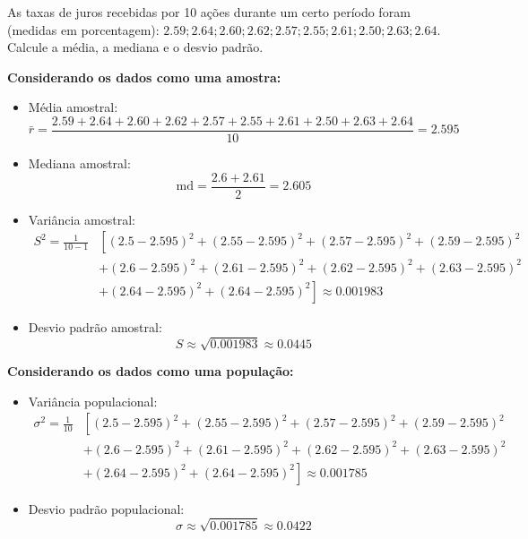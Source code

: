 \documentclass{article}
\begin{document}
As taxas de juros recebidas por 10 ações durante um certo período foram (medidas em porcentagem):
$2.59; 2.64; 2.60; 2.62; 2.57; 2.55; 2.61; 2.50; 2.63; 2.64$. Calcule a média, a mediana e o desvio padrão.

\textbf{Considerando os dados como uma amostra:}

\begin{itemize}
    \item Média amostral:
    \[
    \bar{r} = \frac{2.59 + 2.64 + 2.60 + 2.62 + 2.57 + 2.55 + 2.61 + 2.50 + 2.63 + 2.64}{10} = 2.595
    \]
    
    \item Mediana amostral:
    \[
    \text{md} = \frac{2.6 + 2.61}{2} = 2.605
    \]
    
    \item Variância amostral:
    \[
    \begin{split}
    S^2 = \frac{1}{10 - 1} & \left[ (2.5 - 2.595)^2 + (2.55 - 2.595)^2 + (2.57 - 2.595)^2 + (2.59 - 2.595)^2 \right. \\
    & \left. + (2.6 - 2.595)^2 + (2.61 - 2.595)^2 + (2.62 - 2.595)^2 + (2.63 - 2.595)^2 \right. \\
    & \left. + (2.64 - 2.595)^2 + (2.64 - 2.595)^2 \right] \approx 0.001983
    \end{split}
    \]
    
    \item Desvio padrão amostral:
    \[
    S \approx \sqrt{0.001983} \approx 0.0445
    \]
\end{itemize}

\textbf{Considerando os dados como uma população:}

\begin{itemize}
    \item Variância populacional:
    \[
    \begin{split}
    \sigma^2 = \frac{1}{10} & \left[ (2.5 - 2.595)^2 + (2.55 - 2.595)^2 + (2.57 - 2.595)^2 + (2.59 - 2.595)^2 \right. \\
    & \left. + (2.6 - 2.595)^2 + (2.61 - 2.595)^2 + (2.62 - 2.595)^2 + (2.63 - 2.595)^2 \right. \\
    & \left. + (2.64 - 2.595)^2 + (2.64 - 2.595)^2 \right] \approx 0.001785
    \end{split}
    \]
    
    \item Desvio padrão populacional:
    \[
    \sigma \approx \sqrt{0.001785} \approx 0.0422
    \]
\end{itemize}
\end{document}

